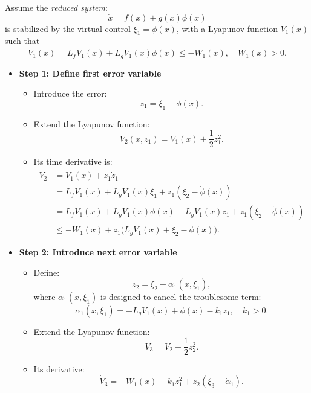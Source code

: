 Assume the \textit{reduced system}:
\begin{equation}
\dot{x} = f(x) + g(x)\phi(x)
\end{equation}
is stabilized by the virtual control $\xi_1 = \phi(x)$, with a Lyapunov function $V_1(x)$ such that
\begin{equation}
\dot{V}_1(x) = L_f V_1(x) + L_g V_1(x) \phi(x) \leq -W_1(x), \quad W_1(x) > 0.
\end{equation}

\begin{itemize}
    
\item\textbf{Step 1: Define first error variable}

\begin{itemize}
    \item Introduce the error:
    \begin{equation}
        z_1 = \xi_1 - \phi(x).
    \end{equation}
    \item Extend the Lyapunov function:
    \begin{equation}
        V_2(x, z_1) = V_1(x) + \frac{1}{2} z_1^2.
    \end{equation}
    \item Its time derivative is:
    \begin{align*}
        \dot{V}_2 &= \dot{V}_1(x) + z_1 \dot{z}_1 \\
        &= L_f V_1(x) + L_g V_1(x)\xi_1 + z_1(\xi_2 - \dot{\phi}(x)) \\
        &= L_f V_1(x) + L_g V_1(x)\phi(x) + L_g V_1(x) z_1 + z_1(\xi_2 - \dot{\phi}(x)) \\
        &\leq -W_1(x) + z_1\big(L_g V_1(x) + \xi_2 - \dot{\phi}(x)\big).
    \end{align*}
\end{itemize}

\item\textbf{Step 2: Introduce next error variable}

\begin{itemize}
    \item Define:
    \begin{equation}
        z_2 = \xi_2 - \alpha_1(x, \xi_1),
    \end{equation}
    where $\alpha_1(x,\xi_1)$ is designed to cancel the troublesome term:
    \begin{equation}
        \alpha_1(x, \xi_1) = -L_g V_1(x) + \dot{\phi}(x) - k_1 z_1, \quad k_1 > 0.
    \end{equation}
    \item Extend the Lyapunov function:
    \begin{equation}
        V_3 = V_2 + \frac{1}{2} z_2^2.
    \end{equation}
    \item Its derivative:
    \begin{equation}
        \dot{V}_3 = -W_1(x) - k_1 z_1^2 + z_2(\xi_3 - \dot{\alpha}_1).
    \end{equation}
\end{itemize}


\end{itemize}
